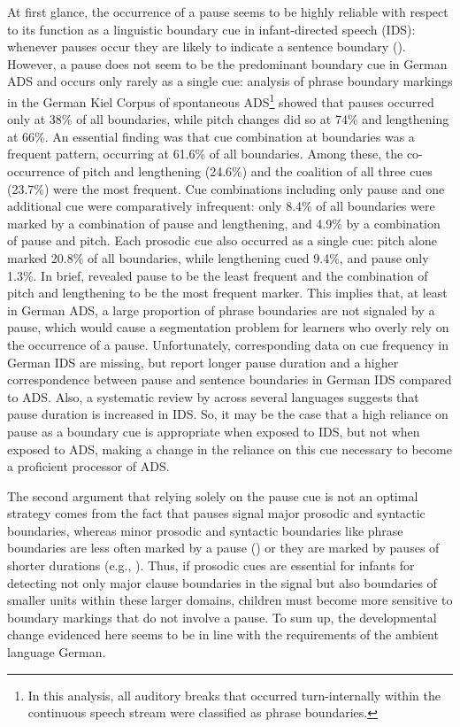 \documentclass[output=paper]{langscibook}
\begin{document}
At first glance, the occurrence of a pause seems to be highly reliable with respect to its function as a linguistic boundary cue in infant-directed speech (IDS): whenever pauses occur they are likely to indicate a sentence boundary (\citealt{Fernald1984, Fisher1996}). However, a pause does not seem to be the predominant boundary cue in German ADS and occurs only rarely as a single cue: \citet{Peters2005PhonetMerk} analysis of phrase boundary markings in the German Kiel Corpus of spontaneous ADS\footnote{In this analysis, all auditory breaks that occurred turn-internally within the continuous speech stream were classified as phrase boundaries.} showed that pauses occurred only at 38\% of all boundaries, while pitch changes did so at 74\% and lengthening at 66\%. An essential finding was that cue combination at boundaries was a frequent pattern, occurring at 61.6\% of all boundaries. Among these, the co-occurrence of pitch and lengthening (24.6\%) and the coalition of all three cues (23.7\%) were the most frequent. Cue combinations including only pause and one additional cue were comparatively infrequent: only 8.4\% of all boundaries were marked by a combination of pause and lengthening, and 4.9\% by a combination of pause and pitch. Each prosodic cue also occurred as a single cue: pitch alone marked 20.8\% of all boundaries, while lengthening cued 9.4\%, and pause only 1.3\%. In brief, \citet{Peters2005PhonetMerk} revealed pause to be the least frequent and the combination of pitch and lengthening to be the most frequent marker. This implies that, at least in German ADS, a large proportion of phrase boundaries are not signaled by a pause, which would cause a segmentation problem for learners who overly rely on the occurrence of a pause. Unfortunately, corresponding data on cue frequency in German IDS are missing, but \citet{Fernald1984} report longer pause duration and a higher correspondence between pause and sentence boundaries in German IDS compared to ADS. Also, a systematic review by \citet{Ludusan2016} across several languages suggests that pause duration is increased in IDS. So, it may be the case that a high reliance on pause as a boundary cue is appropriate when exposed to IDS, but not when exposed to ADS, making a change in the reliance on this cue necessary to become a proficient processor of ADS.

The second argument that relying solely on the pause cue is not an optimal strategy comes from the fact that pauses signal major prosodic and syntactic boundaries, whereas minor prosodic and syntactic boundaries like phrase boundaries are less often marked by a pause (\citealt{Strangert1991, Terken1992}) or they are marked by pauses of shorter durations (e.g., \citealt{Butcher1981, Goldman-Eisler1972}). Thus, if prosodic cues are essential for infants for detecting not only major clause boundaries in the signal but also boundaries of smaller units within these larger domains, children must become more sensitive to boundary markings that do not involve a pause. To sum up, the developmental change evidenced here seems to be in line with the requirements of the ambient language German.
\end{document}
